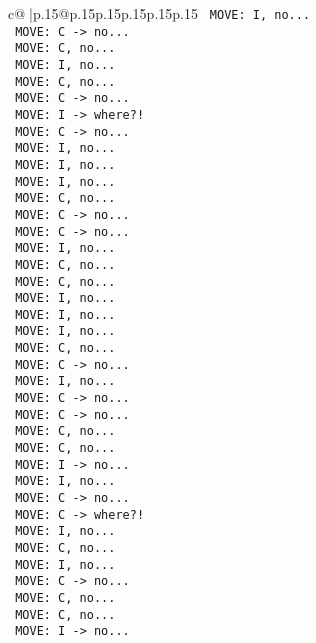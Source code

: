 \documentclass{article}
\begin{document}
{\begin{supertabular}{c@{$\;$}|p{.15\linewidth}@{}p{.15\linewidth}p{.15\linewidth}p{.15\linewidth}p{.15\linewidth}p{.15\linewidth}}
{{{\texttt{ MOVE: I, no...} \\
\texttt{ MOVE: C {-}> no...} \\
\texttt{ MOVE: C, no...} \\
\texttt{ MOVE: I, no...} \\
\texttt{ MOVE: C, no...} \\
\texttt{ MOVE: C {-}> no...} \\
\texttt{ MOVE: I {-}> where?!} \\
\texttt{ MOVE: C {-}> no...} \\
\texttt{ MOVE: I, no...} \\
\texttt{ MOVE: I, no...} \\
\texttt{ MOVE: I, no...} \\
\texttt{ MOVE: C, no...} \\
\texttt{ MOVE: C {-}> no...} \\
\texttt{ MOVE: C {-}> no...} \\
\texttt{ MOVE: I, no...} \\
\texttt{ MOVE: C, no...} \\
\texttt{ MOVE: C, no...} \\
\texttt{ MOVE: I, no...} \\
\texttt{ MOVE: I, no...} \\
\texttt{ MOVE: I, no...} \\
\texttt{ MOVE: C, no...} \\
\texttt{ MOVE: C {-}> no...} \\
\texttt{ MOVE: I, no...} \\
\texttt{ MOVE: C {-}> no...} \\
\texttt{ MOVE: C {-}> no...} \\
\texttt{ MOVE: C, no...} \\
\texttt{ MOVE: C, no...} \\
\texttt{ MOVE: I {-}> no...} \\
\texttt{ MOVE: I, no...} \\
\texttt{ MOVE: C {-}> no...} \\
\texttt{ MOVE: C {-}> where?!} \\
\texttt{ MOVE: I, no...} \\
\texttt{ MOVE: C, no...} \\
\texttt{ MOVE: I, no...} \\
\texttt{ MOVE: C {-}> no...} \\
\texttt{ MOVE: C, no...} \\
\texttt{ MOVE: C, no...} \\
\texttt{ MOVE: I {-}> no...} \\
}}}
\end{supertabular}}
\end{document}
